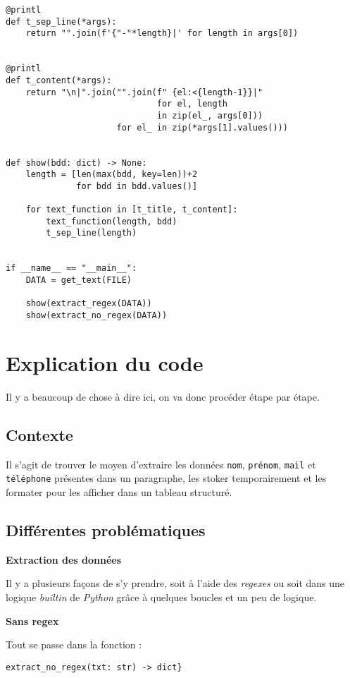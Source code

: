 \begin{lstlisting}
@printl
def t_sep_line(*args):
    return "".join(f'{"-"*length}|' for length in args[0])


@printl
def t_content(*args):
    return "\n|".join("".join(f" {el:<{length-1}}|"
                              for el, length
                              in zip(el_, args[0]))
                      for el_ in zip(*args[1].values()))


def show(bdd: dict) -> None:
    length = [len(max(bdd, key=len))+2 
              for bdd in bdd.values()]

    for text_function in [t_title, t_content]:
        text_function(length, bdd)
        t_sep_line(length)


if __name__ == "__main__":
    DATA = get_text(FILE)

    show(extract_regex(DATA))
    show(extract_no_regex(DATA))
\end{lstlisting}
\medskip

\section{Explication du code}
Il y a beaucoup de chose à dire ici, on va donc procéder étape par étape.
\medskip

\subsection*{Contexte}
Il s'agit de trouver le moyen d'extraire les données \texttt{nom}, \texttt{prénom}, \texttt{mail} et \texttt{téléphone} présentes dans un paragraphe, les stoker temporairement et les formater pour les afficher dans un tableau structuré. 
\medskip

\subsection*{Différentes problématiques}
\textbf{\textbullet{} Extraction des données}
\medskip

Il y a plusieurs façons de s'y prendre, soit à l'aide des \textit{regexes} ou soit dans une logique \textit{builtin} de \textit{Python} grâce à quelques boucles et un peu de logique.
\medskip

\textbf{\textbullet{} Sans regex}
\medskip

Tout se passe dans la fonction : 
\begin{verbatim}
extract_no_regex(txt: str) -> dict}
\end{verbatim}
\medskip

